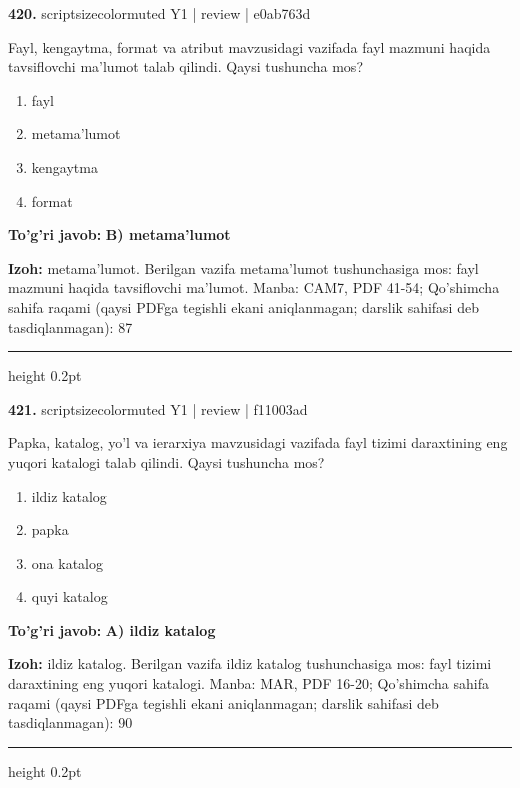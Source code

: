 \documentclass[10pt,a4paper]{article}
\begin{document}
{\bfseries\sffamily\color{ink} 420.} {scriptsizecolor{muted} Y1 | review | e0ab763d}
\par
Fayl, kengaytma, format va atribut mavzusidagi vazifada fayl mazmuni haqida tavsiflovchi ma'lumot talab qilindi. Qaysi tushuncha mos?
\begin{enumerate}[label=\Alph*),leftmargin=9mm]
\item fayl
\item metama'lumot
\item kengaytma
\item format
\end{enumerate}
\begin{tcolorbox}[enhanced,breakable,colback=teal!4,colframe=teal!60!black,boxrule=0.45pt,arc=1.2mm,left=2.7mm,right=2.7mm,top=1.8mm,bottom=1.8mm,before skip=2mm,after skip=2mm]
{\bfseries\sffamily\color{teal}To'g'ri javob:} \textbf{B) metama'lumot}
\par\smallskip
{\bfseries Izoh:} metama'lumot. Berilgan vazifa metama'lumot tushunchasiga mos: fayl mazmuni haqida tavsiflovchi ma'lumot. Manba: CAM7, PDF 41-54; Qo'shimcha sahifa raqami (qaysi PDFga tegishli ekani aniqlanmagan; darslik sahifasi deb tasdiqlanmagan): 87
\end{tcolorbox}
\vspace{2mm}\hrule height 0.2pt\vspace{3mm}

{\bfseries\sffamily\color{ink} 421.} {scriptsizecolor{muted} Y1 | review | f11003ad}
\par
Papka, katalog, yo'l va ierarxiya mavzusidagi vazifada fayl tizimi daraxtining eng yuqori katalogi talab qilindi. Qaysi tushuncha mos?
\begin{enumerate}[label=\Alph*),leftmargin=9mm]
\item ildiz katalog
\item papka
\item ona katalog
\item quyi katalog
\end{enumerate}
\begin{tcolorbox}[enhanced,breakable,colback=teal!4,colframe=teal!60!black,boxrule=0.45pt,arc=1.2mm,left=2.7mm,right=2.7mm,top=1.8mm,bottom=1.8mm,before skip=2mm,after skip=2mm]
{\bfseries\sffamily\color{teal}To'g'ri javob:} \textbf{A) ildiz katalog}
\par\smallskip
{\bfseries Izoh:} ildiz katalog. Berilgan vazifa ildiz katalog tushunchasiga mos: fayl tizimi daraxtining eng yuqori katalogi. Manba: MAR, PDF 16-20; Qo'shimcha sahifa raqami (qaysi PDFga tegishli ekani aniqlanmagan; darslik sahifasi deb tasdiqlanmagan): 90
\end{tcolorbox}
\vspace{2mm}\hrule height 0.2pt\vspace{3mm}
\end{document}
